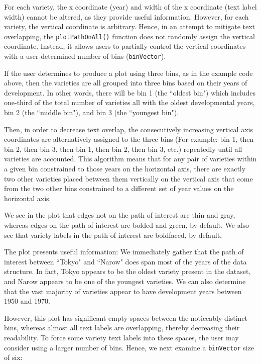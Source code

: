 \documentclass{article}
\numberwithin{equation}{section} %
\begin{document}
For each variety, the x coordinate (year) and width of the x coordinate (text label width) cannot be altered, as they provide useful information. However, for each variety, the vertical coordinate is arbitrary. Hence, in an attempt to mitigate text overlapping, the \texttt{plotPathOnAll()} function does not randomly assign the vertical coordinate. Instead, it allows users to partially control the vertical coordinates with a user-determined number of bins (\texttt{binVector}).

If the user determines to produce a plot using three bins, as in the example code above, then the varieties are all grouped into three bins based on their years of development. In other words, there will be bin 1 (the ``oldest bin") which includes one-third of the total number of varieties all with the oldest developmental years, bin 2 (the ``middle bin"), and bin 3 (the ``youngest bin").

Then, in order to decrease text overlap, the consecutively increasing vertical axis coordinates are alternatively assigned to the three bins (For example: bin 1, then bin 2, then bin 3, then bin 1, then bin 2, then bin 3, etc.) repeatedly until all varieties are accounted. This algorithm means that for any pair of varieties within a given bin constrained to those years on the horizontal axis, there are exactly two other varieties placed between them vertically on the vertical axis that come from the two other bins constrained to a different set of year values on the horizontal axis.

We see in the plot that edges not on the path of interest are thin and gray, whereas edges on the path of interest are bolded and green, by default. We also see that variety labels in the path of interest are boldfaced, by default.

The plot presents useful information: We immediately gather that the path of interest between ``Tokyo" and ``Narow" does span most of the years of the data structure. In fact, Tokyo appears to be the oldest variety present in the dataset, and Narow appears to be one of the youngest varieties. We can also determine that the vast majority of varieties appear to have development years between 1950 and 1970.

However, this plot has significant empty spaces between the noticeably distinct bins, whereas almost all text labels are overlapping, thereby decreasing their readability. To force some variety text labels into these spaces, the user may consider using a larger number of bins. Hence, we next examine a \texttt{binVector} size of six:
\end{document}
